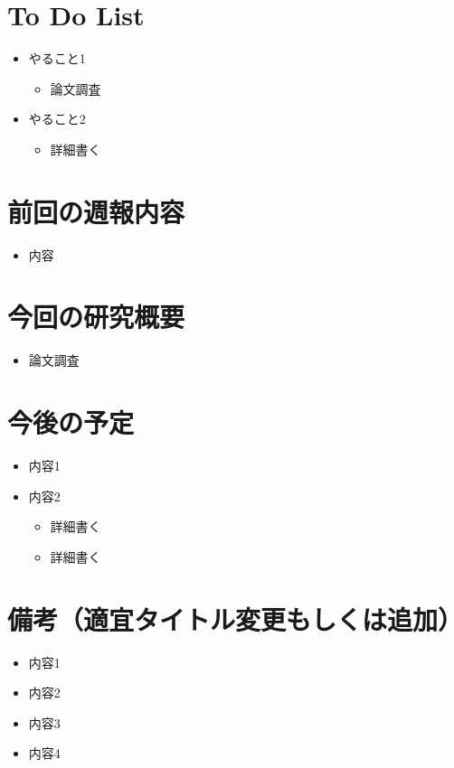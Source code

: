 \section{To Do List}	
	\begin{itemize}
	\item{やること1}
		\begin{itemize}
			\item 論文調査 
		\end{itemize}
	\item {やること2}
		\begin{itemize}
			\item{詳細書く}
		\end{itemize}
	\end{itemize}

\newpage

\section{前回の週報内容}
	\begin{itemize}
	\item{内容}
	\end{itemize}
	
\section{今回の研究概要}
	\begin{itemize}
		\item{論文調査}
	\end{itemize}

\section{今後の予定}
	\begin{itemize}
		\item{内容1}
		\item{内容2}
		\begin{itemize}
			\item{詳細書く}
			\item{詳細書く}
		\end{itemize}
	\end{itemize}

	\section{備考（適宜タイトル変更もしくは追加）}
	\begin{itemize}
		\item{内容1}
		\item{内容2}
		\item {内容3}
		\item {内容4}
	\end{itemize}